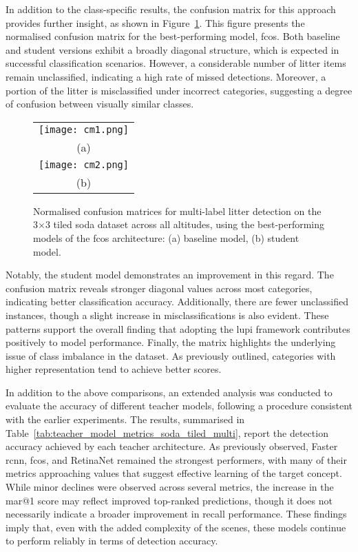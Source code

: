 In addition to the class-specific results, the confusion matrix for this approach provides further insight, as shown in Figure~\ref{fig:cm_soda}. This figure presents the normalised confusion matrix for the best-performing model, \gls{fcos}. Both baseline and student versions exhibit a broadly diagonal structure, which is expected in successful classification scenarios. However, a considerable number of litter items remain unclassified, indicating a high rate of missed detections. Moreover, a portion of the litter is misclassified under incorrect categories, suggesting a degree of confusion between visually similar classes.
\begin{figure}[p]
  \centering
  \begin{tabular}{c}
    \texttt{[image: cm1.png]} \\
    \small (a) \\
    \addlinespace[1em]
    \texttt{[image: cm2.png]} \\
    \small (b) \\
  \end{tabular}
  \caption{Normalised confusion matrices for multi-label litter detection on the 3$\times$3 tiled \gls{soda} dataset across all altitudes, using the best-performing models of the \gls{fcos} architecture: (a) baseline model, (b) student model.}
  \label{fig:cm_soda}
\end{figure}

Notably, the student model demonstrates an improvement in this regard. The confusion matrix reveals stronger diagonal values across most categories, indicating better classification accuracy. Additionally, there are fewer unclassified instances, though a slight increase in misclassifications is also evident. These patterns support the overall finding that adopting the \gls{lupi} framework contributes positively to model performance.
Finally, the matrix highlights the underlying issue of class imbalance in the dataset. As previously outlined, categories with higher representation tend to achieve better scores.

In addition to the above comparisons, an extended analysis was conducted to evaluate the accuracy of different teacher models, following a procedure consistent with the earlier experiments. The results, summarised in Table~\ref{tab:teacher_model_metrics_soda_tiled_multi}, report the detection accuracy achieved by each teacher architecture. As previously observed, Faster \gls{rcnn}, \gls{fcos}, and RetinaNet remained the strongest performers, with many of their metrics approaching values that suggest effective learning of the target concept. While minor declines were observed across several metrics, the increase in the \gls{mar}@1 score may reflect improved top-ranked predictions, though it does not necessarily indicate a broader improvement in recall performance. These findings imply that, even with the added complexity of the scenes, these models continue to perform reliably in terms of detection accuracy.

